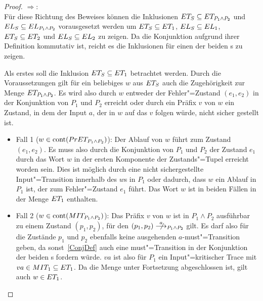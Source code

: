 \begin{proof}
  \glqq $\Rightarrow$\grqq{}:\\
  Für diese Richtung des Beweises können die Inklusionen $ET _S\subseteq ET
  _{P_1\land P_2}$ und $EL _S\subseteq EL _{P_1\land P_2}$ vorausgesetzt
  werden um $ET _S\subseteq ET _1$, $EL _S\subseteq EL _1$, $ET
  _S\subseteq ET _2$ und $EL _S\subseteq EL _2$ zu zeigen. Da die
  Konjunktion aufgrund ihrer Definition kommutativ ist, reicht es die
  Inklusionen für einen der beiden \MEIO{}s zu zeigen.

  Als erstes soll die Inklusion $ET _S\subseteq ET _1$ betrachtet werden.
  Durch die Voraussetzungen gilt für ein beliebiges $w$ aus $ET _S$ auch die
  Zugehörigkeit zur Menge $ET _{P_1\land P_2}$. Es wird also durch $w$
  entweder der Fehler"=Zustand $(e_1,e_2)$ in der Konjunktion von $P_1$ und
  $P_2$ erreicht oder durch ein Präfix $v$ von $w$ ein Zustand, in dem der
  Input $a$, der in $w$ auf das $v$ folgen würde, nicht sicher gestellt ist.
  \begin{itemize}
    \item Fall 1 ($w\in\mathrm{cont} (PrET _{P_1\land P_2})$): Der Ablauf von $w$
      führt zum Zustand $(e_1,e_2)$. Es muss also durch die Konjunktion von
      $P_1$ und $P_2$ der Zustand $e_1$ durch das Wort $w$ in der ersten
      Komponente der Zustands"=Tupel erreicht worden sein. Dies ist möglich durch
      eine nicht sichergestellte Input"=Transition innerhalb des $w$s in $P_1$
      oder dadurch, dass $w$ ein Ablauf in $P_1$ ist, der zum Fehler"=Zustand
      $e_1$ führt. Das Wort $w$ ist in beiden Fällen in der Menge $ET _1$
      enthalten.
    \item Fall 2 ($w\in\mathrm{cont} (MIT _{P_1\land P_2})$): Das Präfix $v$ von $w$
      ist in $P_1\land P_2$ ausführbar zu einem Zustand $(p_1,p_2)$, für den
      $(p_1,p_2)\nmust[a]_{P_1\land P_2}$ gilt. Es darf also für die Zustände
      $p_1$ und $p_2$ ebenfalls keine ausgehenden $a$-must"=Transition geben, da
      sonst~\ref{ConjDef} auch eine must"=Transition in der Konjunktion der
      beiden \MEIO{}s fordern würde. $va$ ist also für $P_1$ ein
      Input"=kritischer Trace mit $va\in MIT _1\subseteq ET _1$. Da die Menge
      \ET{} unter Fortsetzung abgeschlossen ist, gilt auch $w\in ET _1$.
  \end{itemize}


\end{proof}
